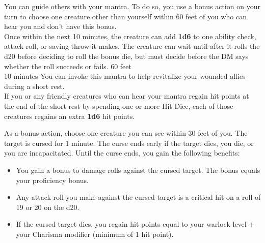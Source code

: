 \documentclass{article}
\begin{document}
\begin{center}

    {You can guide others with your mantra. To do so, you use a bonus action on your turn to choose one creature other than yourself within 60 feet of you who can hear you and don't have this bonus.
    \\[1mm]
    Once within the next 10 minutes, the creature can add \textbf{1d6} to one ability check, attack roll, or saving throw it makes. The creature can wait until after it rolls the d20 before deciding to roll the bonus die, but must decide before the DM says whether the roll succeeds or fails.}
    {60 feet\\10 minutes}%
    {You can invoke this mantra to help revitalize your wounded allies during a short rest.
    \\[1mm]
    If you or any friendly creatures who can hear your mantra regain hit points at the end of the short rest by spending one or more Hit Dice, each of those creatures regains an extra \textbf{1d6} hit points.}
    {}%
    {As a bonus action, choose one creature you can see within 30 feet of you. The target is cursed for 1 minute. The curse ends early if the target dies, you die, or you are incapacitated. Until the curse ends, you gain the following benefits:

    \begin{itemize}[topsep=0pt]
        \setlength\itemsep{-0.5em}
        \item You gain a bonus to damage rolls against the cursed target. The bonus equals your proficiency bonus.
        \item Any attack roll you make against the cursed target is a critical hit on a roll of 19 or 20 on the d20.
        \item If the cursed target dies, you regain hit points equal to your warlock level + your Charisma modifier (minimum of 1 hit point).
    \end{itemize}

}
\end{center}
\end{document}
